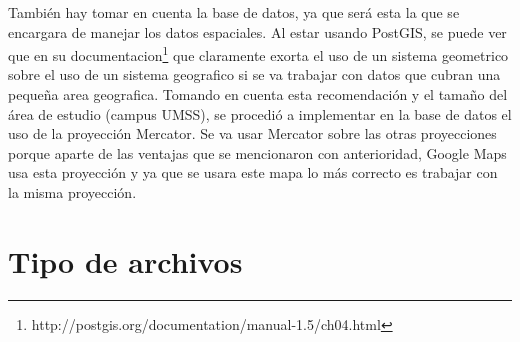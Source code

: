         También hay tomar en cuenta la base de datos, ya que será esta la que se encargara de manejar los datos espaciales. Al estar usando PostGIS, se puede ver que en su documentacion\footnote{ http://postgis.org/documentation/manual-1.5/ch04.html} que claramente exorta el uso de un sistema geometrico sobre el uso de un sistema geografico si  se va trabajar con datos que cubran una peque\~na area geografica. Tomando en cuenta esta recomendaci\'on y el tama\~no del área de estudio (campus UMSS), se procedió a implementar en la base de datos el uso de la proyecci\'on Mercator. Se va usar Mercator sobre las otras proyecciones porque aparte de las ventajas que se mencionaron con anterioridad, Google Maps usa esta proyecci\'on y ya que se usara este mapa lo más correcto es trabajar con la misma proyecci\'on.  
       


  \section{Tipo de archivos} %
  \label{sec:tipo_de_archivos}
  

